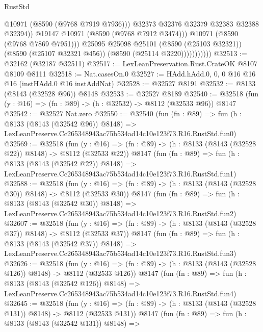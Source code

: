 \begin{lexlean}{RustStd}
\begin{coremodule}
                                @10971
                                (@8590 (@9768 @7919 @7936)))
                              @32373
                              @32376
                              @32379
                              @32383
                              @32388
                              @32394))
                          @19147
                          @10971
                          (@8590 (@9768 @7912 @3474)))
                        @10971
                        (@8590 (@9768 @7869 @7951)))
                      @25095
                      @25098
                      @25101
                      (@8590 (@25103 @32321))
                      (@8590 (@25107 @32321 @456))
                      (@8590 (@25114 @3220)))))))))))
@32513 := @32162 (@32187 @32511)
@32517 := LexLeanPreservation.Rust.CrateOK @8107 @8109 @8111
@32518 := Nat.casesOn.{0}
@32527 := HAdd.hAdd.{0, 0, 0} @16 @16 @16 (instHAdd.{0} @16 instAddNat)
@32528 := @32527 @8191
@32532 := @8133 (@8143 (@32528 @96)) @8148
@32533 := @32527 @8189
@32540 := @32518 (fun (y : @16) => (fn : @89) -> (h : @32532) -> @8112 (@32533 @96)) @8147
@32542 := @32527 Nat.zero
@32550 := @32540
    (fun (fn : @89) =>
    fun (h : @8133 (@8143 (@32542 @96)) @8148) =>
    LexLeanPreserve.Cc265348943ac75b534ad14c10e123f73.R16.RustStd.fun0)
@32569 := @32518
    (fun (y : @16) => (fn : @89) -> (h : @8133 (@8143 (@32528 @22)) @8148) -> @8112 (@32533 @22))
    @8147
    (fun (fn : @89) =>
    fun (h : @8133 (@8143 (@32542 @22)) @8148) =>
    LexLeanPreserve.Cc265348943ac75b534ad14c10e123f73.R16.RustStd.fun1)
@32588 := @32518
    (fun (y : @16) => (fn : @89) -> (h : @8133 (@8143 (@32528 @30)) @8148) -> @8112 (@32533 @30))
    @8147
    (fun (fn : @89) =>
    fun (h : @8133 (@8143 (@32542 @30)) @8148) =>
    LexLeanPreserve.Cc265348943ac75b534ad14c10e123f73.R16.RustStd.fun2)
@32607 := @32518
    (fun (y : @16) => (fn : @89) -> (h : @8133 (@8143 (@32528 @37)) @8148) -> @8112 (@32533 @37))
    @8147
    (fun (fn : @89) =>
    fun (h : @8133 (@8143 (@32542 @37)) @8148) =>
    LexLeanPreserve.Cc265348943ac75b534ad14c10e123f73.R16.RustStd.fun3)
@32626 := @32518
    (fun (y : @16) => (fn : @89) -> (h : @8133 (@8143 (@32528 @126)) @8148) -> @8112 (@32533 @126))
    @8147
    (fun (fn : @89) =>
    fun (h : @8133 (@8143 (@32542 @126)) @8148) =>
    LexLeanPreserve.Cc265348943ac75b534ad14c10e123f73.R16.RustStd.fun4)
@32645 := @32518
    (fun (y : @16) => (fn : @89) -> (h : @8133 (@8143 (@32528 @131)) @8148) -> @8112 (@32533 @131))
    @8147
    (fun (fn : @89) =>
    fun (h : @8133 (@8143 (@32542 @131)) @8148) =>

\end{coremodule}
\end{lexlean}
